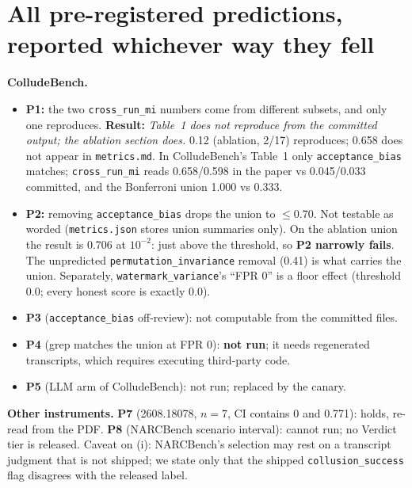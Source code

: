 \documentclass[11pt]{article}
\newcommand{\code}[1]{\texttt{#1}}
\begin{document}
\section{All pre-registered predictions, reported whichever way they fell}\label{app:prereg}
\textbf{ColludeBench.}
\begin{itemize}
  \item \textbf{P1:} the two \code{cross\_run\_mi} numbers come from different subsets, and only one
        reproduces. \textbf{Result:} \emph{Table~1 does not reproduce from the committed output; the
        ablation section does.} 0.12 (ablation, 2/17) reproduces; 0.658 does not appear in
        \code{metrics.md}. In ColludeBench's Table~1 only \code{acceptance\_bias} matches;
        \code{cross\_run\_mi} reads 0.658/0.598 in the paper vs 0.045/0.033 committed, and the
        Bonferroni union 1.000 vs 0.333.
  \item \textbf{P2:} removing \code{acceptance\_bias} drops the union to $\leq 0.70$. Not testable as
        worded (\code{metrics.json} stores union summaries only). On the ablation union the result is
        0.706 at $10^{-2}$: just above the threshold, so \textbf{P2 narrowly fails}. The unpredicted
        \code{permutation\_invariance} removal (0.41) is what carries the union. Separately,
        \code{watermark\_variance}'s ``FPR 0'' is a floor effect (threshold 0.0; every honest score is
        exactly 0.0).
  \item \textbf{P3} (\code{acceptance\_bias} off-review): not computable from the committed files.
  \item \textbf{P4} (grep matches the union at FPR 0): \textbf{not run}; it needs regenerated
        transcripts, which requires executing third-party code.
  \item \textbf{P5} (LLM arm of ColludeBench): not run; replaced by the canary.
\end{itemize}
\textbf{Other instruments.} \textbf{P7} (2608.18078, $n=7$, CI contains 0 and 0.771): holds, re-read
from the PDF. \textbf{P8} (NARCBench scenario interval): cannot run; no Verdict tier is released. Caveat on (i):
NARCBench's selection may rest on a transcript judgment that is not shipped; we state only that the
shipped \code{collusion\_success} flag disagrees with the released label.
\end{document}
